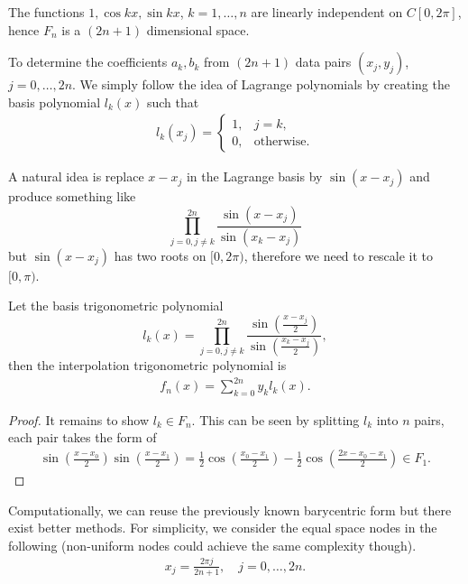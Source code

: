 \begin{corollary}
\label{Cor: 2-Fou-bas-ind}
    The functions $1, \cos kx, \sin kx$, $k=1,\dots, n$ are linearly independent on $C [0, 2\pi]$, hence $F_n$ is a $(2n+1)$ dimensional space.
\end{corollary}
To determine the coefficients $a_k, b_k$ from $(2n+1)$ data pairs $(x_j, y_j)$, $j=0, \dots, 2n$. We simply follow the idea of Lagrange polynomials by creating the basis polynomial $l_k(x)$ such that
\begin{eqnarray}
    l_k(x_j) = \begin{cases}
        1, &j = k,\\
        0,&\text{otherwise}.
    \end{cases} 
\end{eqnarray}
\begin{remark}
    A natural idea is replace $x - x_j$ in the Lagrange basis by $\sin(x - x_j)$ and produce something like 
$$\prod_{j=0, j\neq k}^{2n}\frac{\sin(x - x_j)}{\sin(x_k - x_j)}$$
but $\sin(x - x_j)$ has two roots on $[0, 2\pi)$, therefore we need to rescale it to $[0, \pi)$.
\end{remark}
\begin{theorem}
\label{Thm: 2-Tri-Lag}
    Let the basis trigonometric polynomial 
    $$l_k(x) =\prod_{j=0, j\neq k}^{2n}\frac{\sin(\frac{x - x_j}{2})}{\sin(\frac{x_k - x_j}{2})} ,$$
    then the interpolation trigonometric polynomial is 
    \begin{eqnarray}
        f_n(x) = \sum_{k=0}^{2n} y_k l_k(x).
    \end{eqnarray}
\end{theorem}
\begin{proof}
    It remains to show $l_k\in F_n$. This can be seen by splitting $l_k$ into $n$ pairs, each pair takes the form of 
    \begin{eqnarray}
        \sin(\frac{x-x_0}{2})\sin(\frac{x-x_1}{2}) = \frac{1}{2}\cos\left( \frac{x_0 - x_1}{2}\right) - \frac{1}{2}\cos\left(\frac{2x - x_0 - x_1}{2}\right)\in F_1.
    \end{eqnarray}
\end{proof}
Computationally, we can reuse the previously known barycentric form but there exist better methods. For simplicity, we consider the equal space nodes in the following (non-uniform nodes could achieve the same complexity though). 
\begin{eqnarray}
    x_j = \frac{2\pi j}{2n + 1}, \quad j = 0, \dots, 2n. 
\end{eqnarray}
